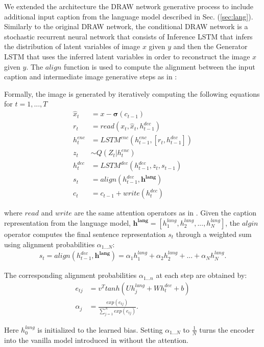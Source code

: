 \documentclass{article} %
\newcommand{\sigmoid}{\boldsymbol{\sigma}}
\newcommand{\hlang}{h^{lang}}
\newcommand{\hlangall}{\boldsymbol{h^{lang}}}
\newcommand{\hdec}{h^{dec}}
\newcommand{\henc}{h^{enc}}
\newcommand{\readop}{\mathit{read}}
\newcommand{\writeop}{\mathit{write}}
\newcommand{\encoder}{\mathit{LSTM}^{enc}}
\newcommand{\decoder}{\mathit{LSTM}^{dec}}
\newcommand{\canv}{c}
\newcommand{\lat}{z}
\newcommand{\Lat}{Z}
\newcommand{\post}{Q}
\begin{document}
We extended the architecture the DRAW network generative process to include additional input caption from the language model described in Sec. (\ref{sec:lang}). Similarly to the original DRAW network, the conditional DRAW network is a stochastic recurrent neural network that consists of Inference LSTM that infers the distribution of latent variables of image $x$ given $y$ and then the Generator LSTM that uses the inferred latent variables in order to reconstruct the image $x$ given $y$. The $align$ function is used to compute the alignment between the input caption and intermediate image generative steps as in \cite{bahdanau_mt}:

Formally, the image is generated by iteratively computing the following equations for $t=1,...,T$
\begin{align}
\label{eq:x_hat}
\hat{x}_t &= x-\sigmoid(\canv_{t-1})\\
\label{eq:read}
r_t &= \readop(x_t, \hat{x}_t, \hdec_{t-1})\\
\henc_t &= \encoder(\henc_{t-1}, [r_t, \hdec_{t-1}])\\
\lat_t &\sim \post(\Lat_t|\henc_t)\\
\hdec_t &= \decoder(\hdec_{t-1}, z_t, s_{t-1})\\
s_{t} &= align(\hdec_{t-1}, \hlangall) \\
\label{eq:write}
\canv_t &= \canv_{t-1} + \writeop(\hdec_t)
\end{align}

where $\readop$ and $\writeop$ are the same attention operators as in \citep{gregor_draw}.
Given the caption representation from the language model, $\hlangall = [\hlang_{1}, \hlang_{2}, ..., \hlang_{N}]$, the $algin$ operator computes the final sentence representation $s_t$ through a weighted sum using alignment probabilities $\alpha_{1...N}$:
\begin{align}
s_t=align(\hdec_{t-1}, \hlangall) = \alpha_{1}\hlang_{1} + \alpha_{2}\hlang_{2} + ... + \alpha_{N}\hlang_{N}.
\end{align}

The corresponding alignment probabilities $\alpha_{1...n}$ at each step are obtained by:
\begin{align}
e_{tj} &= v^{T}tanh(U\hlang_{j} + W\hdec_{t} + b)\\
\alpha_{j} &= \frac{exp(e_{tj})}{\sum_{j=1}^{N}exp(e_{tj})}.
\end{align}

Here $\hlang_{0}$ is initialized to the learned bias.
Setting $\alpha_{1...N}$ to $\frac{1}{N}$ turns the encoder into the vanilla model introduced in \citep{cho_mt} without the attention. 
\end{document}
